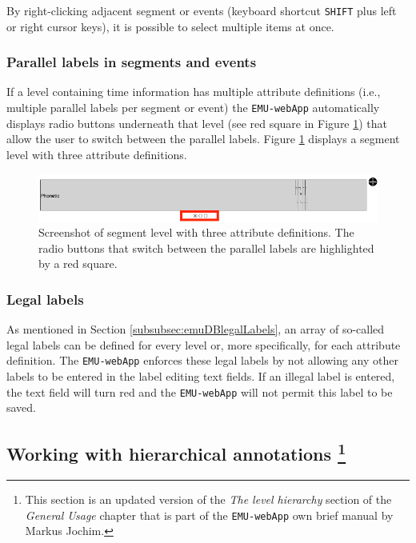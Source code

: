 \documentclass[]{book}
\let\rmarkdownfootnote\footnote%
\def\footnote{\protect\rmarkdownfootnote}
\theoremstyle{definition}
\theoremstyle{definition}
\theoremstyle{definition}
\theoremstyle{remark}
\begin{document}
By right-clicking adjacent segment or events (keyboard shortcut
\texttt{SHIFT} plus left or right cursor keys), it is possible to select
multiple items at once.

\hypertarget{parallel-labels-in-segments-and-events}{%
\subsubsection{Parallel labels in segments and
events}\label{parallel-labels-in-segments-and-events}}

If a level containing time information has multiple attribute
definitions (i.e., multiple parallel labels per segment or event) the
\texttt{EMU-webApp} automatically displays radio buttons underneath that
level (see red square in Figure \ref{fig:webApp-parTimeLevel}) that
allow the user to switch between the parallel labels. Figure
\ref{fig:webApp-parTimeLevel} displays a segment level with three
attribute definitions.

\begin{figure}

{\centering \includegraphics[width=0.75\linewidth]{pics/emu-webAppParTimeLevel} 

}

\caption{Screenshot of segment level with three attribute definitions. The radio buttons that switch between the parallel labels are highlighted by a red square.}\label{fig:webApp-parTimeLevel}
\end{figure}

\hypertarget{legal-labels}{%
\subsubsection{Legal labels}\label{legal-labels}}

As mentioned in Section \ref{subsubsec:emuDBlegalLabels}, an array of
so-called legal labels can be defined for every level or, more
specifically, for each attribute definition. The \texttt{EMU-webApp}
enforces these legal labels by not allowing any other labels to be
entered in the label editing text fields. If an illegal label is
entered, the text field will turn red and the \texttt{EMU-webApp} will
not permit this label to be saved.

\hypertarget{working-with-hierarchical-annotations-2-chapemu-webapp}{%
\subsection[Working with hierarchical annotations
]{\texorpdfstring{Working with hierarchical annotations \footnote{This
  section is an updated version of the \emph{The level hierarchy}
  section of the \emph{General Usage} chapter that is part of the
  \texttt{EMU-webApp} own brief manual by Markus Jochim.}}{Working with hierarchical annotations }}\label{working-with-hierarchical-annotations-2-chapemu-webapp}}
\end{document}
